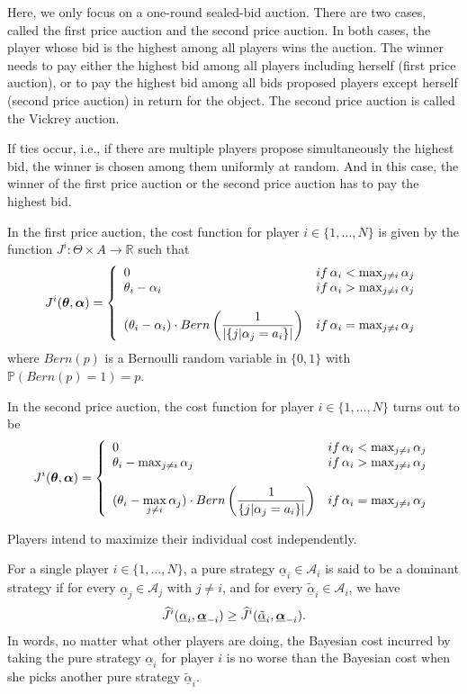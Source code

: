 Here, we only focus on a one-round sealed-bid auction. There are two cases, called the first price auction and the second price auction. In both cases, the player whose bid is the highest among all players wins the auction. The winner needs to pay either the highest bid among all players including herself (first price auction), or to pay the highest bid among all bids proposed players except herself (second price auction) in return for the object. The second price auction is called the Vickrey auction. 

If ties occur, i.e., if there are multiple players propose simultaneously the highest bid, the winner is chosen among them uniformly at random. And in this case, the winner of the first price auction or the second price auction has to pay the highest bid.


In the first price auction, the cost function for player $i \in \{1,\ldots,N\}$ is given by the function $J^i : \Theta \times A \to \mathbb{R}$ such that
$$
J^i(\boldsymbol{\theta}, \boldsymbol{\alpha}) = \left\{
\begin{array}{lc}
0 & if \, \alpha_i < \max_{j \neq i} \alpha_j \\
\displaystyle \theta_i - \alpha_i & if \, \alpha_i > \max_{j \neq i} \alpha_j \\
\\
\displaystyle ( \theta_i- \alpha_i ) \cdot Bern\left(\frac{1}{\displaystyle | \{j | \alpha_j = a_i \} |} \right) & if \, \alpha_i = \max_{j \neq i} \alpha_j
\end{array}
\right. 
$$
where $Bern(p)$ is a Bernoulli random variable in $\{0,1\}$ with $\mathbb{P}(Bern(p) = 1) = p$. 

In the second price auction, the cost function for player $i\in\{1,\ldots,N\}$ turns out to be
$$
J^i(\boldsymbol{\theta}, \boldsymbol{\alpha}) = \left\{
\begin{array}{lc}
0 & if \, \alpha_i < \max_{j \neq i} \alpha_j \\
\theta_i - \max_{j \neq i} \alpha_j  & if \, \alpha_i > \max_{j \neq i} \alpha_j \\
\\
\displaystyle 
( \theta_i - \max_{j\neq i} \alpha_j  ) \cdot Bern \left( \frac{1}{\{j | \alpha_j = a_i \} |} \right) & if \, \alpha_i = \max_{j \neq i} \alpha_j 
\end{array}
\right. 
$$


Players intend to maximize their individual cost independently.

\begin{definition}
	For a single player $i \in \{1,\ldots,N\}$, a pure strategy $\underline{\alpha}_i \in \mathcal{A}_i$ is said to be a dominant strategy if for every $\underline{\alpha}_j \in \mathcal{A}_j$ with $j\neq i$, and for every $\underline{\tilde{\alpha}}_i \in \mathcal{A}_i$, we have
	$$
	\widehat{J}^i(\underline{\alpha}_i, \underline{\boldsymbol{\alpha}}_{-i})  \geq \widehat{J}^i( \underline{\tilde{\alpha}}_i, \underline{\boldsymbol{\alpha}}_{-i} ).
	$$ 
	In words, no matter what other players are doing, the Bayesian cost incurred by taking the pure strategy $\underline{\alpha}_i$ for player $i$ is no worse than the Bayesian cost when she picks another pure strategy $\tilde{\underline{\alpha}}_i$.
\end{definition}



